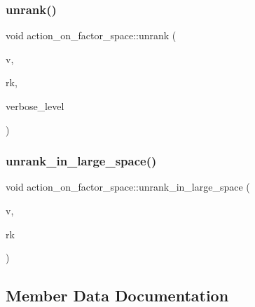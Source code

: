 \subsubsection{\texorpdfstring{unrank()}{unrank()}}
{\footnotesize\ttfamily void action\+\_\+on\+\_\+factor\+\_\+space\+::unrank (\begin{DoxyParamCaption}\item[{\mbox{\hyperlink{galois_8h_a09fddde158a3a20bd2dcadb609de11dc}{I\+NT}} $\ast$}]{v,  }\item[{\mbox{\hyperlink{galois_8h_a09fddde158a3a20bd2dcadb609de11dc}{I\+NT}}}]{rk,  }\item[{\mbox{\hyperlink{galois_8h_a09fddde158a3a20bd2dcadb609de11dc}{I\+NT}}}]{verbose\+\_\+level }\end{DoxyParamCaption})}

\mbox{\label{classaction__on__factor__space_af2b5fc47970e8914d5d51cad78f00c52}} 
\subsubsection{\texorpdfstring{unrank\+\_\+in\+\_\+large\+\_\+space()}{unrank\_in\_large\_space()}}
{\footnotesize\ttfamily void action\+\_\+on\+\_\+factor\+\_\+space\+::unrank\+\_\+in\+\_\+large\+\_\+space (\begin{DoxyParamCaption}\item[{\mbox{\hyperlink{galois_8h_a09fddde158a3a20bd2dcadb609de11dc}{I\+NT}} $\ast$}]{v,  }\item[{\mbox{\hyperlink{galois_8h_a09fddde158a3a20bd2dcadb609de11dc}{I\+NT}}}]{rk }\end{DoxyParamCaption})}



\subsection{Member Data Documentation}
\mbox{\label{classaction__on__factor__space_af04fda1e4e94adb24bca2b7e6872bca3}} 
